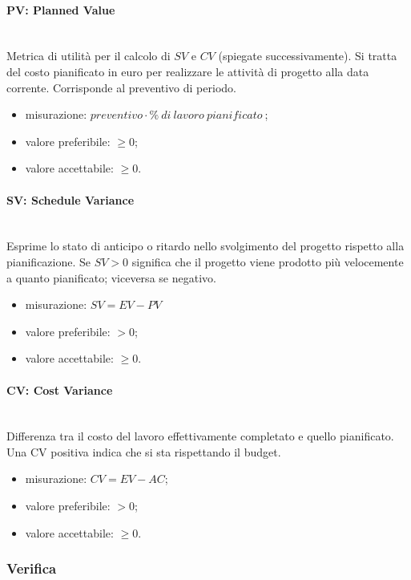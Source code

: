 			\paragraph*{PV: Planned Value}\mbox{}\\
			Metrica di utilità per il calcolo di $SV$ e $CV$ (spiegate successivamente). Si tratta del costo pianificato in euro per realizzare le attività di progetto alla data corrente. Corrisponde al preventivo di periodo.
			\begin{itemize}
				\item  misurazione: $preventivo \cdot \%\ di\ lavoro\ pianificato\ $;
				\item  valore preferibile: $ \geq 0$;
				\item  valore accettabile: $ \geq 0$.
			\end{itemize}			
			\paragraph*{SV: Schedule Variance}\mbox{}\\
			Esprime lo stato di anticipo o ritardo nello svolgimento del progetto rispetto alla pianificazione.
			Se $SV > 0$ significa che il progetto viene prodotto più velocemente a quanto pianificato; viceversa se negativo.
			\begin{itemize}
				\item misurazione: $SV = EV - PV$
				\item valore preferibile: $ > 0$;
				\item valore accettabile: $\geq 0$.
			\end{itemize}
			\paragraph*{CV: Cost Variance}\mbox{}\\
			Differenza tra il costo del lavoro effettivamente completato e quello pianificato. Una CV positiva indica che si sta rispettando il budget.
			\begin{itemize}
				\item misurazione: $CV = EV - AC$;
				\item valore preferibile: $ > 0$;
				\item valore accettabile: $ \geq 0$.
			\end{itemize}

	\subsubsection{Verifica}
